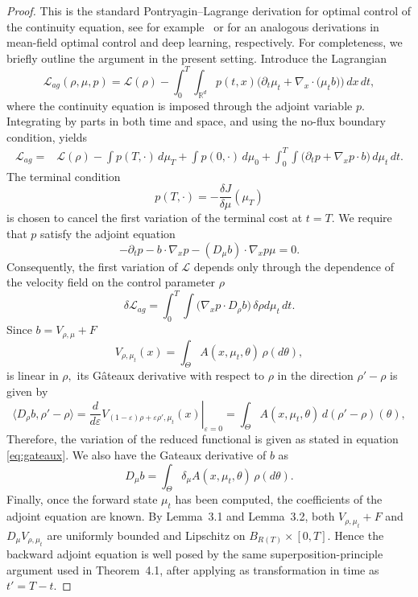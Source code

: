 \documentclass[11pt,a4wide]{article}
\theoremstyle{definition}
\begin{document}
\begin{proof}
 \fi  
This is the standard Pontryagin--Lagrange derivation for optimal control of the continuity equation, see for example~ \cite[Ch.~6]{carmona2018probabilistic} or \cite{e2019meanfield} for an analogous derivations in mean-field optimal control and deep learning, respectively. For completeness, we briefly outline the argument in the present setting. Introduce the Lagrangian
\[
\mathcal{L}_{ag} (\rho,\mu,p) 
=
\mathcal L (\rho)
-
\int_0^T
\int_{\mathbb{R}^d}
p(t,x)
\Big(
\partial_t\mu_t
+
\nabla_x\cdot
\big(
\mu_t b
\big)
\Big)
\,dx\,dt,
\]
where the continuity equation is imposed through the adjoint variable
$p$. Integrating by parts in both time and space, and using the no-flux
boundary condition, yields
\[
\begin{aligned}
\mathcal{L}_{ag}  
= & 
\mathcal L (\rho)
-\int p(T,\cdot)\,d\mu_T
+\int p(0,\cdot)\,d\mu_0
+
\int_0^T
\int
\Big(
\partial_t p
+
\nabla_x p\cdot b
\Big)
\,d\mu_t\,dt .
\end{aligned}
\]
The terminal condition
\[
p(T,\cdot)
=
-\frac{\delta J}{\delta\mu}(\mu_T)
\]
is chosen to cancel the first variation of the terminal cost  at $t=T$. We require that $p$ satisfy the adjoint
equation
\[
-\partial_t p
-
b \cdot\nabla_x p - (D_\mu b)\cdot \nabla_x p \mu = 0.
\]
Consequently, the  first variation of
$\mathcal{L}$ depends only through  the dependence of the velocity
field on the control parameter $\rho$
$$
\delta \mathcal{L}_{ag}=   \int_0^T
\int
\Big(
\nabla_x p\cdot D_\rho b
\Big)
\, \delta \rho d\mu_t\,dt .
$$
Since  $b=V_{\rho,\mu} +F$  
\[
V_{\rho,\mu_t}(x)
=
\int_\Theta
A(x,\mu_t,\theta)\,\rho(d\theta),
\]
is linear in $\rho,$ 
its Gâteaux derivative with respect to $\rho$ in the direction
$\rho'-\rho$ is given by 
\[
\left.
\langle D_\rho b, \rho'-\rho \rangle  =\frac{d}{d\varepsilon}
V_{(1-\varepsilon)\rho+\varepsilon\rho',\mu_t}(x)
\right|_{\varepsilon=0}
=
\int_\Theta
A(x,\mu_t,\theta)\,
d(\rho'-\rho)(\theta),
\]
Therefore, the variation of the reduced functional is given as 
stated in equation \eqref{eq:gateaux}.   We also have the Gateaux derivative of $b$ as 
$$
D_\mu b= \int_\Theta 
\delta_\mu A(x,\mu_t,\theta)\,\rho(d\theta).
$$
Finally, once the forward state $\mu_t$ has been computed, the
coefficients of the adjoint equation are known. By Lemma~3.1 and
Lemma~3.2, both
$V_{\rho,\mu_t}+F$
and
$D_\mu V_{\rho,\mu_t}$
are uniformly bounded and Lipschitz on
$B_{R(T)}\times[0,T]$.
Hence the backward adjoint equation is well posed by the same
superposition-principle argument used in Theorem~4.1, after applying as transformation in time as $t'=T-t$. 
\end{proof}
\end{document}

